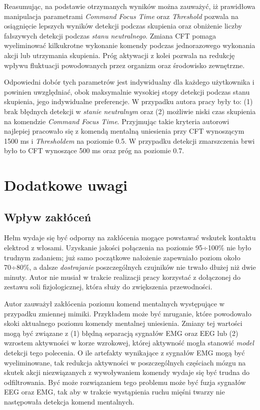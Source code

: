 \documentclass[skorowidz,skroty]{dyplomWEZUT}
\begin{document}
Reasumując, na podstawie otrzymanych wyników można zauważyć, iż prawidłowa manipulacja parametrami \textit{Command Focus Time} oraz \textit{Threshold} pozwala na osiągnięcie lepszych wyników detekcji podczas skupienia oraz obniżenie liczby fałszywych detekcji podczas \textit{stanu neutralnego}. Zmiana CFT pomaga wyeliminować kilkukrotne wykonanie komendy podczas jednorazowego wykonania akcji lub utrzymania skupienia. Próg aktywacji z kolei pozwala na redukcję wpływu fluktuacji powodowanych przez organizm oraz środowisko zewnętrzne. 

Odpowiedni dobór tych parametrów jest indywidualny dla każdego użytkownika i powinien uwzględniać, obok maksymalnie wysokiej stopy detekcji podczas stanu skupienia, jego indywidualne preferencje. W przypadku autora pracy były to: (1) brak błędnych detekcji w \textit{stanie neutralnym} oraz (2) możliwie niski czas skupienia na komendzie \textit{Command Focus Time}. Przyjmując takie kryteria autorowi najlepiej pracowało się z komendą mentalną uniesienia przy CFT wynoszącym 1500 ms i \textit{Thresholdem} na poziomie 0.5. W przypadku detekcji zmarszczenia brwi było to CFT wynoszące 500 ms oraz próg na poziomie 0.7.


\section{Dodatkowe uwagi}
\subsection{Wpływ zakłóceń}
Hełm wydaje się być odporny na zakłócenia mogące powstawać wskutek kontaktu elektrod z włosami. Uzyskanie jakości połączenia na poziomie 95÷100\% nie było trudnym zadaniem; już samo początkowe nałożenie zapewniało poziom około 70÷80\%, a dalsze \textit{dostrajanie} poszczególnych czujników nie trwało dłużej niż dwie minuty. Autor nie musiał w trakcie realizacji pracy korzystać z dołączonej do zestawu soli fizjologicznej, która służy do zwiększenia przewodności.

Autor zauważył zakłócenia poziomu komend mentalnych występujące w przypadku zmiennej mimiki. Przykładem może być mruganie, które powodowało skoki aktualnego poziomu komendy mentalnej uniesienia. Zmiany tej wartości mogą być związane z (1) błędną separacją sygnałów EMG oraz EEG lub (2) wzrostem aktywności w korze wzrokowej, której aktywność mogła stanowić \textit{model} detekcji tego polecenia. O ile artefakty wynikające z sygnałów EMG mogą być wyeliminowane, tak redukcja aktywności w poszczególnych częściach mózgu na skutek akcji niezwiązanych z wywoływaniem komendy wydaje się być trudna do odfiltrowania. Być może rozwiązaniem tego problemu może być fuzja sygnałów EEG oraz EMG, tak aby w trakcie wystąpienia ruchu mięśni twarzy nie następowała detekcja komend mentalnych.
\end{document}
